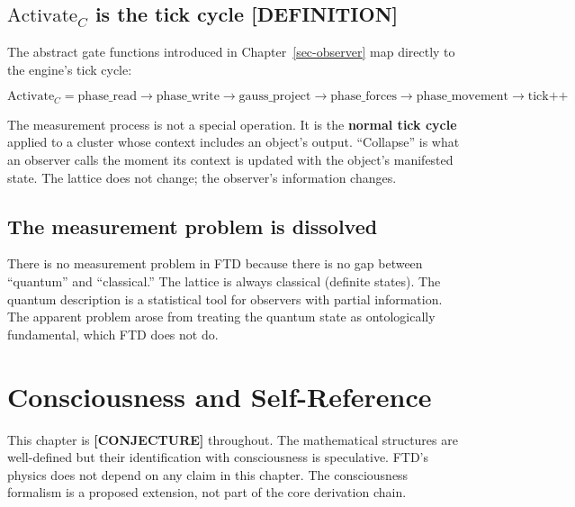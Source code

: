 \documentclass[
  11pt,
  letterpaper,
  twoside,
  openany]{book}
\makeatletter
\let\orig@section\section
\renewcommand{\section}{\needspace{8\baselineskip}\orig@section}
\makeatother
\begin{document}
\section{\texorpdfstring{\(\text{Activate}_C\) is the tick cycle
{[}DEFINITION{]}}{\textbackslash text\{Activate\}\_C is the tick cycle {[}DEFINITION{]}}}\label{textactivate_c-is-the-tick-cycle-definition}

The abstract gate functions introduced in Chapter~\ref{sec-observer} map
directly to the engine's tick cycle:

\[
\text{Activate}_C = \text{phase\_read} \to \text{phase\_write} \to \text{gauss\_project} \to \text{phase\_forces} \to \text{phase\_movement} \to \text{tick++}
\]

The measurement process is not a special operation. It is the
\textbf{normal tick cycle} applied to a cluster whose context includes
an object's output. ``Collapse'' is what an observer calls the moment
its context is updated with the object's manifested state. The lattice
does not change; the observer's information changes.

\section{The measurement problem is
dissolved}\label{the-measurement-problem-is-dissolved}

There is no measurement problem in FTD because there is no gap between
``quantum'' and ``classical.'' The lattice is always classical (definite
states). The quantum description is a statistical tool for observers
with partial information. The apparent problem arose from treating the
quantum state as ontologically fundamental, which FTD does not do.

\chapter{Consciousness and Self-Reference}\label{sec-consciousness}

\begin{tcolorbox}[enhanced jigsaw, colbacktitle=quarto-callout-warning-color!10!white, titlerule=0mm, bottomtitle=1mm, bottomrule=.15mm, colback=white, arc=.35mm, breakable, toprule=.15mm, title=\textcolor{quarto-callout-warning-color}{\faExclamationTriangle}\hspace{0.5em}{Epistemic notice}, rightrule=.15mm, coltitle=black, leftrule=.75mm, colframe=quarto-callout-warning-color-frame, toptitle=1mm, opacityback=0, opacitybacktitle=0.6, left=2mm]

This chapter is \textbf{{[}CONJECTURE{]}} throughout. The mathematical
structures are well-defined but their identification with consciousness
is speculative. FTD's physics does not depend on any claim in this
chapter. The consciousness formalism is a proposed extension, not part
of the core derivation chain.

\end{tcolorbox}
\end{document}
